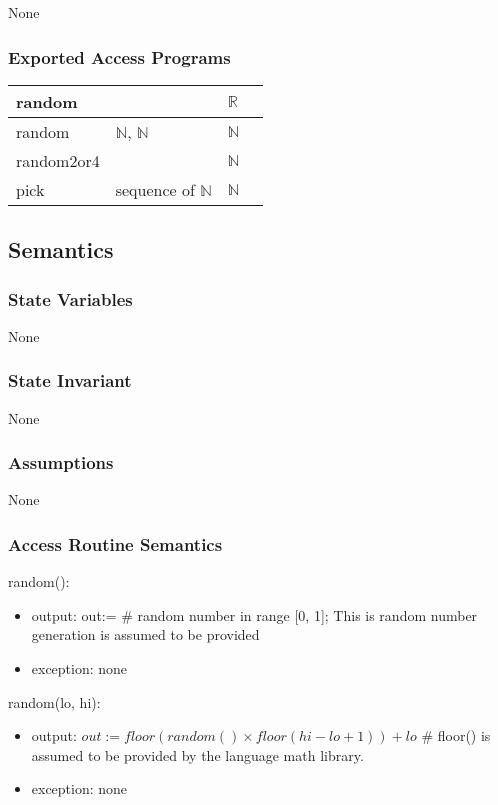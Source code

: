 \documentclass[12pt]{article}
\begin{document}
None

\subsubsection* {Exported Access Programs}

\begin{tabular}{| l | l | l | p{5cm} |}
  \hline
    random & & $\mathbb{R}$ & \\
  \hline
    random & $\mathbb{N}$, $\mathbb{N}$  & $\mathbb{N}$ & \\
  \hline
 random2or4& & $\mathbb{N}$ & \\
  \hline
 pick & sequence of  $\mathbb{N}$& $\mathbb{N}$ & \\
  \hline
  
\end{tabular}

\subsection* {Semantics}

\subsubsection* {State Variables}

None

\subsubsection* {State Invariant}

None

\subsubsection* {Assumptions}

None

\subsubsection* {Access Routine Semantics}

\noindent random():
\begin{itemize}
\item output: out:= \# random number in range [0, 1]; This is random number generation is assumed to be provided
\item exception: none
\end{itemize}

\noindent random(lo, hi):
\begin{itemize}
\item output: $out := floor(random() \times floor(hi - lo + 1)) + lo$ \# floor() is assumed to be provided by the language math library.
\item exception: none
\end{itemize}
\end{document}
